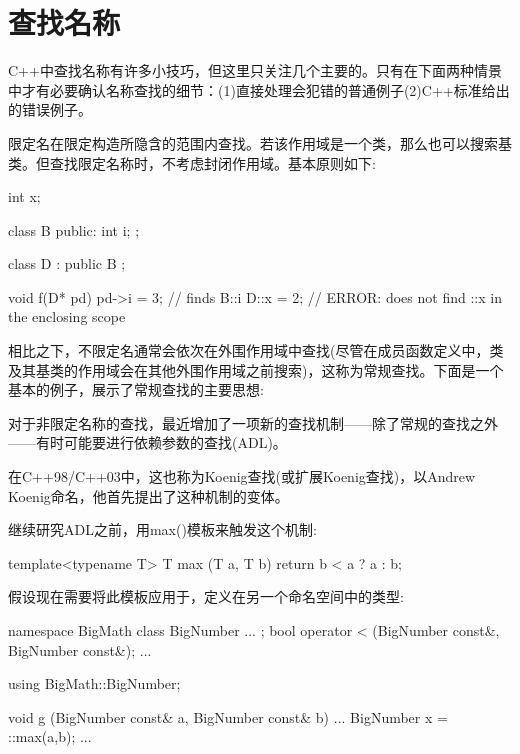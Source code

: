 \section{查找名称}

C++中查找名称有许多小技巧，但这里只关注几个主要的。只有在下面两种情景中才有必要确认名称查找的细节：(1)直接处理会犯错的普通例子(2)C++标准给出的错误例子。

限定名在限定构造所隐含的范围内查找。若该作用域是一个类，那么也可以搜索基类。但查找限定名称时，不考虑封闭作用域。基本原则如下:

\begin{cpp}
int x;

class B {
	public:
	int i;
};

class D : public B {
};

void f(D* pd)
{
	pd->i = 3; // finds B::i
	D::x = 2; // ERROR: does not find ::x in the enclosing scope
}
\end{cpp}

相比之下，不限定名通常会依次在外围作用域中查找(尽管在成员函数定义中，类及其基类的作用域会在其他外围作用域之前搜索)，这称为常规查找。下面是一个基本的例子，展示了常规查找的主要思想:


对于非限定名称的查找，最近增加了一项新的查找机制——除了常规的查找之外——有时可能要进行依赖参数的查找(ADL)。

\begin{notice}
在C++98/C++03中，这也称为Koenig查找(或扩展Koenig查找)，以Andrew Koenig命名，他首先提出了这种机制的变体。
\end{notice}

继续研究ADL之前，用max()模板来触发这个机制:

\begin{cpp}
template<typename T>
T max (T a, T b)
{
	return b < a ? a : b;
}
\end{cpp}

假设现在需要将此模板应用于，定义在另一个命名空间中的类型:

\begin{cpp}
namespace BigMath {
	class BigNumber {
		...
	};
	bool operator < (BigNumber const&, BigNumber const&);
	...
}

using BigMath::BigNumber;

void g (BigNumber const& a, BigNumber const& b)
{
	...
	BigNumber x = ::max(a,b);
	...
}
\end{cpp}

